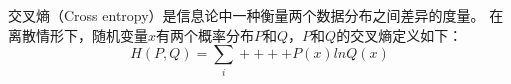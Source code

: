
交叉熵（Cross entropy）是信息论中一种衡量两个数据分布之间差异的度量。
在离散情形下，随机变量$x$有两个概率分布$P$和$Q$，$P$和$Q$的交叉熵定义如下：
\begin{equation}
H(P,Q)=\sum_i++++P(x)lnQ(x)
\end{equation}